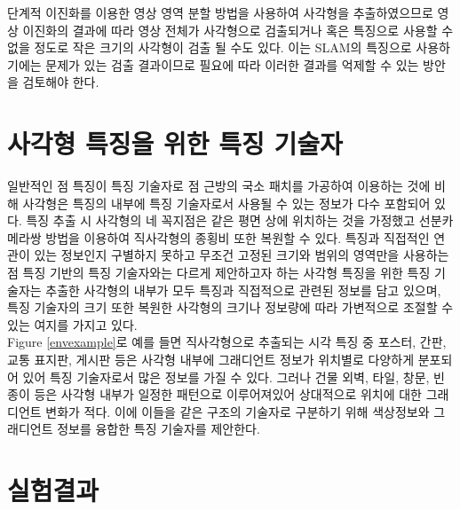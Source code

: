 \documentclass[master,korean,final]{cbnu-ecs}
\begin{document}
단계적 이진화를 이용한 영상 영역 분할 방법을 사용하여 사각형을 추출하였으므로 영상 이진화의 결과에 따라 영상 전체가 사각형으로 검출되거나 혹은 특징으로 사용할 수 없을 정도로 작은 크기의 사각형이 검출 될 수도 있다. 이는 SLAM의 특징으로 사용하기에는 문제가 있는 검출 결과이므로 필요에 따라 이러한 결과를 억제할 수 있는 방안을 검토해야 한다.
\chapter{사각형 특징을 위한 특징 기술자}
일반적인 점 특징이 특징 기술자로 점 근방의 국소 패치를 가공하여 이용하는 것에 비해 사각형은 특징의 내부에 특징 기술자로서 사용될 수 있는 정보가 다수 포함되어 있다. 특징 추출 시 사각형의 네 꼭지점은 같은 평면 상에 위치하는 것을 가정했고 선분카메라쌍 방법을 이용하여 직사각형의 종횡비 또한 복원할 수 있다. 특징과 직접적인 연관이 있는 정보인지 구별하지 못하고 무조건 고정된 크기와 범위의 영역만을 사용하는 점 특징 기반의 특징 기술자와는 다르게 제안하고자 하는 사각형 특징을 위한 특징 기술자는 추출한 사각형의 내부가 모두 특징과 직접적으로 관련된 정보를 담고 있으며, 특징 기술자의 크기 또한 복원한 사각형의 크기나 정보량에 따라 가변적으로 조절할 수 있는 여지를 가지고 있다. \\
Figure \ref{envexample}로 예를 들면 직사각형으로 추출되는 시각 특징 중 포스터, 간판, 교통 표지판, 게시판 등은 사각형 내부에 그래디언트 정보가 위치별로 다양하게 분포되어 있어 특징 기술자로서 많은 정보를 가질 수 있다. 그러나 건물 외벽, 타일, 창문, 빈 종이 등은 사각형 내부가 일정한 패턴으로 이루어져있어 상대적으로 위치에 대한 그래디언트 변화가 적다. 이에 이들을 같은 구조의 기술자로 구분하기 위해 색상정보와 그래디언트 정보를 융합한 특징 기술자를 제안한다.\\
\chapter{실험결과}
\end{document}
